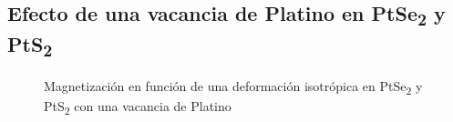 \subsection{Efecto de una vacancia de Platino en PtSe\textsubscript{2} y PtS\textsubscript{2}} \label{Sim:subsec:strPtx2}
\begin{figure}[!hbt]
	\centering
	\caption[Magnetizaci\'on del PtSe\textsubscript{2} y PtSe\textsubscript{2} con una vacancia de Platino bajo una deformaci\'on isotr\'opica]{Magnetizaci\'on en funci\'on de una deformaci\'on isotr\'opica en PtSe\textsubscript{2} y PtS\textsubscript{2} con una vacancia de Platino}
	\label{Sim:fig:magnPtX2}
\end{figure}
